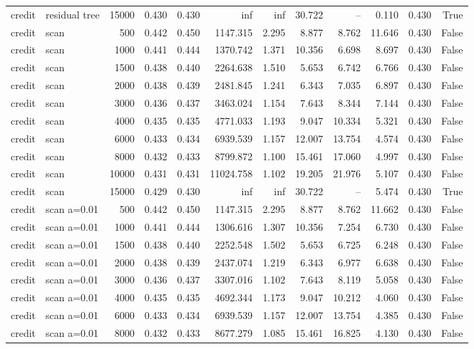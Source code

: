 \begin{tabular}{llrrrrrrrrrr}
credit & residual tree & 15000 & 0.430 & 0.430 & inf & inf & 30.722 & -- & 0.110 & 0.430 & True \\
credit & scan & 500 & 0.442 & 0.450 & 1147.315 & 2.295 & 8.877 & 8.762 & 11.646 & 0.430 & False \\
credit & scan & 1000 & 0.441 & 0.444 & 1370.742 & 1.371 & 10.356 & 6.698 & 8.697 & 0.430 & False \\
credit & scan & 1500 & 0.438 & 0.440 & 2264.638 & 1.510 & 5.653 & 6.742 & 6.766 & 0.430 & False \\
credit & scan & 2000 & 0.438 & 0.439 & 2481.845 & 1.241 & 6.343 & 7.035 & 6.897 & 0.430 & False \\
credit & scan & 3000 & 0.436 & 0.437 & 3463.024 & 1.154 & 7.643 & 8.344 & 7.144 & 0.430 & False \\
credit & scan & 4000 & 0.435 & 0.435 & 4771.033 & 1.193 & 9.047 & 10.334 & 5.321 & 0.430 & False \\
credit & scan & 6000 & 0.433 & 0.434 & 6939.539 & 1.157 & 12.007 & 13.754 & 4.574 & 0.430 & False \\
credit & scan & 8000 & 0.432 & 0.433 & 8799.872 & 1.100 & 15.461 & 17.060 & 4.997 & 0.430 & False \\
credit & scan & 10000 & 0.431 & 0.431 & 11024.758 & 1.102 & 19.205 & 21.976 & 5.107 & 0.430 & False \\
credit & scan & 15000 & 0.429 & 0.430 & inf & inf & 30.722 & -- & 5.474 & 0.430 & True \\
credit & scan a=0.01 & 500 & 0.442 & 0.450 & 1147.315 & 2.295 & 8.877 & 8.762 & 11.662 & 0.430 & False \\
credit & scan a=0.01 & 1000 & 0.441 & 0.444 & 1306.616 & 1.307 & 10.356 & 7.254 & 6.730 & 0.430 & False \\
credit & scan a=0.01 & 1500 & 0.438 & 0.440 & 2252.548 & 1.502 & 5.653 & 6.725 & 6.248 & 0.430 & False \\
credit & scan a=0.01 & 2000 & 0.438 & 0.439 & 2437.074 & 1.219 & 6.343 & 6.977 & 6.638 & 0.430 & False \\
credit & scan a=0.01 & 3000 & 0.436 & 0.437 & 3307.016 & 1.102 & 7.643 & 8.119 & 5.058 & 0.430 & False \\
credit & scan a=0.01 & 4000 & 0.435 & 0.435 & 4692.344 & 1.173 & 9.047 & 10.212 & 4.060 & 0.430 & False \\
credit & scan a=0.01 & 6000 & 0.433 & 0.434 & 6939.539 & 1.157 & 12.007 & 13.754 & 4.385 & 0.430 & False \\
credit & scan a=0.01 & 8000 & 0.432 & 0.433 & 8677.279 & 1.085 & 15.461 & 16.825 & 4.130 & 0.430 & False \\

\end{tabular}
